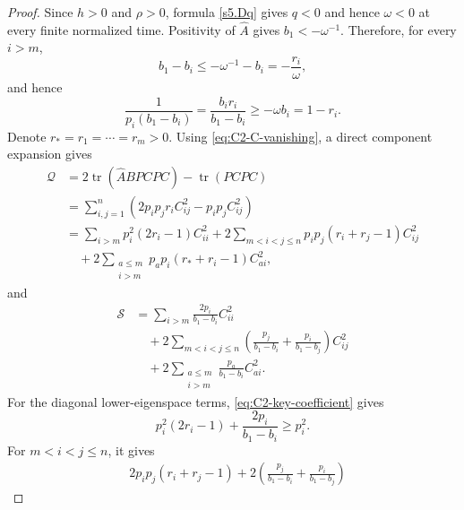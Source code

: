 \documentclass[11pt, reqno]{amsart}
\theoremstyle{remark}
\theoremstyle{definition}
\numberwithin{equation}{section}
\DeclareMathOperator{\tr}{tr}
\begin{document}
\begin{proof}
Since $h>0$ and $\rho>0$, formula \eqref{s5.Dq} gives
$q<0$ and hence $\omega<0$ at every finite normalized time. Positivity of $\widehat A$ gives
$b_1<-\omega^{-1}$.  Therefore, for every $i>m$,
\begin{equation*}
        b_1-b_i\le -\omega^{-1}-b_i=-\frac{r_i}{\omega},
\end{equation*}
and hence
\begin{equation}\label{eq:C2-key-coefficient}
        \frac1{p_i(b_1-b_i)}
        =\frac{b_i r_i}{b_1-b_i}
        \ge -\omega b_i=1-r_i.
\end{equation}
Denote $r_*=r_1=\cdots=r_m>0$.  Using
\eqref{eq:C2-C-vanishing}, a direct component expansion gives
\begin{equation*}
\begin{split}
        \mathcal Q 
        &= 2\tr(\widehat{A}BPCPC) - \tr(PCPC) \\
        &=\sum\limits_{i,j=1}^n \left(2p_ip_jr_iC_{ij}^2-p_ip_j C_{ij}^2 \right)\\
        &=\sum_{i>m}p_i^2(2r_i-1)C_{ii}^2
          +2\sum_{m<i<j\le n}
             p_i p_j(r_i+r_j-1)C_{ij}^2\\
        &\quad
          +2\sum_{\substack{a\le m\\ i>m}}
             p_a p_i(r_*+r_i-1)C_{ai}^2,
\end{split}
\end{equation*}
and
\begin{equation*}
\begin{split}
        \mathcal S
        &=\sum_{i>m}\frac{2p_i}{b_1-b_i}C_{ii}^2\\
        &\quad
          +2\sum_{m<i<j\le n}
            \left(\frac{p_j}{b_1-b_i}
                  +\frac{p_i}{b_1-b_j}\right)C_{ij}^2\\
        &\quad
          +2\sum_{\substack{a\le m\\ i>m}}
             \frac{p_a}{b_1-b_i}C_{ai}^2.
\end{split}
\end{equation*}
For the diagonal lower-eigenspace terms,
\eqref{eq:C2-key-coefficient} gives
\begin{equation*}
        p_i^2(2r_i-1)+\frac{2p_i}{b_1-b_i}
        \ge p_i^2.
\end{equation*}
For $m<i<j\le n$, it gives
\begin{equation*}
\begin{split}
        &2p_i p_j(r_i+r_j-1)
        +2\left(\frac{p_j}{b_1-b_i}
                 +\frac{p_i}{b_1-b_j}\right)

\end{split}
\end{equation*}
\end{proof}
\end{document}
